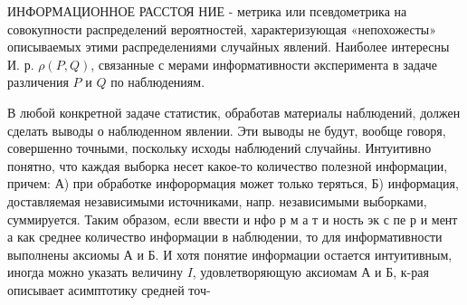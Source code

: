 \documentclass[10pt]{article}
\begin{document}
ИНФОРМАЦИОННОЕ РАССТОЯ НИЕ - метрика или псевдометрика на совокупности распределений вероятностей, характеризующая «непохожесты» описываемых этими распределениями случайных явлений. Наиболее интересны И. р. $\rho(P, Q)$, связанные с мерами информативности әксперимента в задаче различения $P$ и $Q$ по наблюдениям.



В любой конкретной задаче статистик, обработав материалы наблюдений, должен сделать выводы о наблюденном явлении. Эти выводы не будут, вообще говоря, совершенно точными, поскольку исходы наблюдений случайны. Интуитивно понятно, что каждая выборка несет какое-то количество полезной информации, причем: А) при обработке инфорормация может только теряться, Б) информация, доставляемая независимыми источниками, напр. независимыми выборками, суммируется. Таким образом, если ввести и нфо р м а т и ность эк с пе р и мент а как среднее количество информации в наблюдении, то для информативности выполнены аксиомы А и Б. И хотя понятие информации остается интуитивным, иногда можно указать величину $I$, удовлетворяющую аксиомам А и Б, к-рая описывает асимптотику средней точ-
\end{document}
